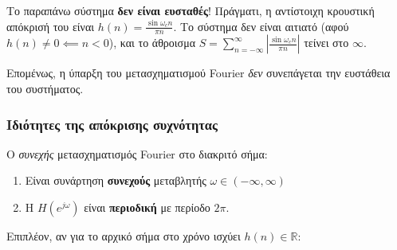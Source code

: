 \documentclass[11pt,a4paper,notitlepage,fleqn,draft]{article}
\begin{document}
Το παραπάνω σύστημα \textbf{δεν είναι ευσταθές}! Πράγματι, η αντίστοιχη κρουστική απόκρισή του είναι
\( h(n) = \frac{\sin\omega_c n}{\pi n} \). Το σύστημα δεν είναι αιτιατό (αφού \( h(n)\neq 0 \impliedby n <0 \)), και το άθροισμα \( \displaystyle S = \sum_{n=-\infty}^{\infty} \left| \frac{\sin\omega_c n}{\pi n} \right| \) τείνει στο \( \infty \).

Επομένως, η ύπαρξη του μετασχηματισμού Fourier \emph{δεν} συνεπάγεται την ευστάθεια του συστήματος.

\subsubsection{Ιδιότητες της απόκρισης συχνότητας}
Ο \emph{συνεχής} μετασχηματισμός Fourier στο διακριτό σήμα:
\begin{enumerate}
	\item Είναι συνάρτηση \textbf{συνεχούς} μεταβλητής \( \omega \in (-\infty,\infty) \)
	\item Η \( H\left( e^{j\omega } \right) \) είναι \textbf{περιοδική} με περίοδο \( 2π \).
\end{enumerate}

Επιπλέον, αν για το αρχικό σήμα στο χρόνο ισχύει \( h(n)\in\mathbb R \):
\end{document}
